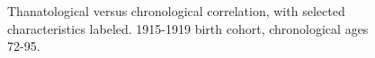 \documentclass[11pt,oneside,a4paper]{article}
\begin{document}
\begin{figure}[!h]
    \centering
    \caption{Thanatological versus chronological correlation, with selected
    characteristics labeled. 1915-1919 birth cohort, chronological ages 72-95.}
    \label{fig:thanochronocorr}
\end{figure}
\end{document}
